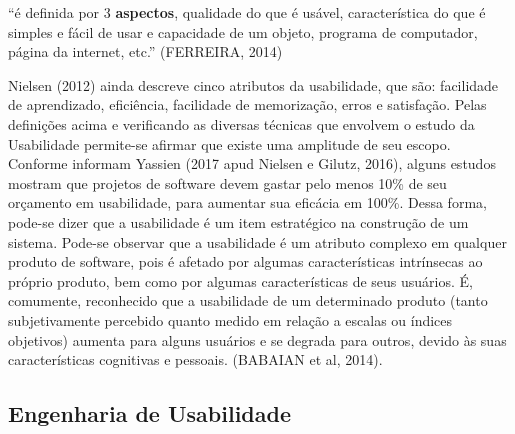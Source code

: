 	{\raggedleft
	\hspace*{4.5cm} 
	\begin{minipage}{0.7\textwidth} 
		“é definida por 3 \textbf{aspectos}, qualidade do que é usável, característica do que é simples e fácil de usar e capacidade de um objeto, programa de computador, página da internet, etc.” (FERREIRA, 2014)\newline	
	\end{minipage}
	\par}

Nielsen (2012) ainda descreve cinco atributos da usabilidade, que são: facilidade de aprendizado, eficiência, facilidade de memorização, erros e satisfação.\newline
\indent Pelas definições acima e verificando as diversas técnicas que envolvem o estudo da Usabilidade permite-se afirmar que existe uma amplitude de seu escopo.\newline
\indent Conforme informam Yassien (2017 apud Nielsen e Gilutz, 2016), alguns estudos mostram que projetos de software devem gastar pelo menos 10\% de seu orçamento em usabilidade, para aumentar sua eficácia em 100\%. Dessa forma, pode-se dizer que a usabilidade é um item estratégico na construção de um sistema.\newline
\indent Pode-se observar que a usabilidade é um atributo complexo em qualquer produto de software, pois é afetado por algumas características intrínsecas ao próprio produto, bem como por algumas características de seus usuários. É, comumente, reconhecido que a usabilidade de um determinado produto (tanto subjetivamente percebido quanto medido em relação a escalas ou índices objetivos) aumenta para alguns usuários e se degrada para outros, devido às suas características cognitivas e pessoais. (BABAIAN et al, 2014).

\subsection{Engenharia de Usabilidade}  \label{Engenharia Usabilidade}

